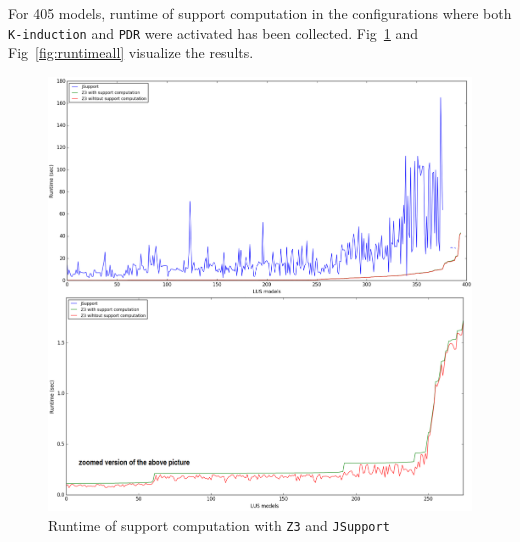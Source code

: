 For 405 models, runtime of support computation in the configurations where both \texttt{K-induction} and \texttt{PDR} were activated has been collected. Fig~\ref{fig:runtimez3} and Fig~\ref{fig:runtimeall} visualize the results.


\begin{figure}
  \centering
  \includegraphics[width=\textwidth]{figs/runtimeZ3.png}
  \caption{\small{Runtime of support computation with \texttt{Z3} and \texttt{JSupport}}}\label{fig:runtimez3}
\end{figure}


